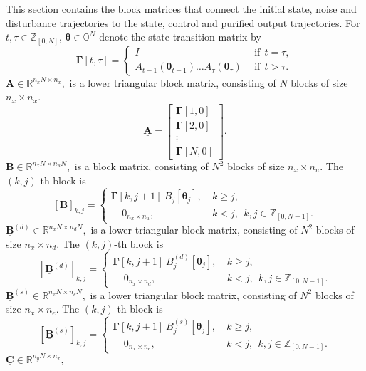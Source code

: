 \documentclass[letterpaper,11pt]{article}
\newcommand{\AR}[2]{\left[\begin{array}{#1}#2\end{array}\right]}
\begin{document}
This section contains the block matrices that connect the initial state, noise and disturbance trajectories to the state, control 
and purified output trajectories.
For $t, \tau \in \mathbb{Z}_{[0,N]}$, $ \bm{\theta} \in \mathbb{O}^N$ denote the  state transition matrix by 
$$
\bm{\Gamma}[t,\tau] = \begin{cases}
 I     ~~&\text{if} ~~ t = \tau, \\
 A_{t-1}(\bm{\theta}_{t-1}) \hdots A_{\tau}(\bm{\theta}_{\tau}) ~~&\text{if} ~~ t > \tau.
\end{cases}
$$
$\underline{\mathbf{A}} \in \mathbb{R}^{n_x  N \times n_x},$ 	
	is a lower triangular block matrix, consisting of $N$ blocks of size $ n_x \times n_x$.
	\begin{equation*}
	\label{z2x}
	\underline{\mathbf{A}} = \AR{c} { \bm{\Gamma}[1,0]  \\ \bm{\Gamma}[2,0] \\ \vdots \\ \bm{\Gamma}[N,0]}. 
	\end{equation*}
$\underline{\mathbf{B}} \in \mathbb{R}^{n_x  N \times n_u N},$ 	
is a  block matrix, consisting of $N^2$ blocks of size $ n_x \times n_u$.
The $(k,j)$-th block is
$$
[\underline{\mathbf{B}}]_{k,j} = 	\begin{cases}
\bm{\Gamma}[k,j+1] ~ B_j[\bm{\theta}_j], ~& k \geq j, \\
~~~~~0_{n_x \times n_u}, ~& k < j,~~ k,j \in \mathbb{Z}_{[0,N-1]}.
\end{cases}
$$	
$\underline{\mathbf{B}}^{(d)}  \in \mathbb{R}^{n_x  N \times n_d N},$ 	
is a lower triangular block matrix, consisting of $N^2$ blocks of size $ n_x \times n_d$.
The $(k,j)$-th block is
$$
[\underline{\mathbf{B}}^{(d)}]_{k,j} = 	\begin{cases}
\bm{\Gamma}[k,j+1] ~ B_j^{(d)}[\bm{\theta}_j], ~& k \geq j, \\
~~~~~0_{n_x \times n_d}, ~& k < j,~~ k,j \in \mathbb{Z}_{[0,N-1]}.
\end{cases}
$$	
$\underline{\mathbf{B}}^{(s)}  \in \mathbb{R}^{n_x  N \times n_e N},$ 	
is a lower triangular block matrix, consisting of $N^2$ blocks of size $ n_x \times n_e$.
The $(k,j)$-th block is
$$
[\underline{\mathbf{B}}^{(s)}]_{k,j} = 	\begin{cases}
\bm{\Gamma}[k,j+1] ~ B_j^{(s)}[\bm{\theta}_j], ~& k \geq j, \\
~~~~~0_{n_x \times n_e}, ~& k < j,~~ k,j \in \mathbb{Z}_{[0,N-1]}.
\end{cases}
$$	
$  \underline{\mathbf{C}}  \in \mathbb{R}^{n_y N \times n_x},$ 
\end{document}
